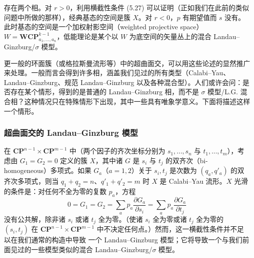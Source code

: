 
存在两个相。对 $r>0$，利用横截性条件 (5.27) 可以证明（正如我们在此前的类似问题中所做的那样），经典基态的空间是簇 $X$。对 $r<0$，$p$ 有期望值而 $s$ 没有。此时基态的空间是一个加权射影空间（weighted projective space）$W=\mathbf{WCP}^{k-1}_{a_1,\ldots,a_n}$，低能理论是某个以 $W$ 为底空间的矢量丛上的混合 Landau--Ginzburg/$\sigma$ 模型。


更一般的环面簇（或格拉斯曼流形等）中的超曲面交，可以用这些论述的显然推广来处理。一般而言会得到许多相，涵盖我们见过的所有类型（Calabi--Yau、Landau--Ginzburg、规范 Landau--Ginzburg 以及各种混合型）。人们或许会问：是否存在某个情形，得到的是普通的 Landau--Ginzburg 相，而不是 $\sigma$ 模型/L.G. 混合相？这种情况只在特殊情形下出现，其中一些具有唯象学意义。下面将描述这样一个情形。

\subsubsection*{超曲面交的 Landau--Ginzburg 模型}

在 $\mathbf{CP}^{n-1}\times\mathbf{CP}^{m-1}$ 中（两个因子的齐次坐标分别为 $s_1,\ldots,s_n$ 与 $t_1,\ldots,t_m$），考虑由 $G_1=G_2=0$ 定义的簇 $X$，其中诸 $G$ 是 $s_i$ 与 $t_j$ 的双齐次（bi-homogeneous）多项式。如果 $G_a$（$a=1,2$）关于 $s_i,t_j$ 是次数为 $(q_a,q'_a)$ 的双齐次多项式，则当 $q_1+q_2=n$、$q'_1+q'_2=m$ 时 $X$ 是 Calabi--Yau 流形。$X$ 光滑的条件是：对任何不全为零的复数 $p_a$，方程
\begin{equation}\tag{5.31}
0=G_1=G_2=\sum_a p_a\frac{\partial G_a}{\partial s_i}=\sum_a p_a\frac{\partial G_a}{\partial t_j}
\end{equation}
没有公共解，除非诸 $s_i$ 或诸 $t_j$ 全为零。（使诸 $s_i$ 全为零或诸 $t_j$ 全为零的 $(s_i,t_j)$ 在 $\mathbf{CP}^{n-1}\times\mathbf{CP}^{m-1}$ 中不决定任何点。）然而，这一横截性条件并不足以在我们通常的构造中导致%
\label{op:64}
一个 Landau--Ginzburg 模型；它将导致一个与我们前面见过的一些模型类似的混合 Landau--Ginzburg/$\sigma$ 模型。

